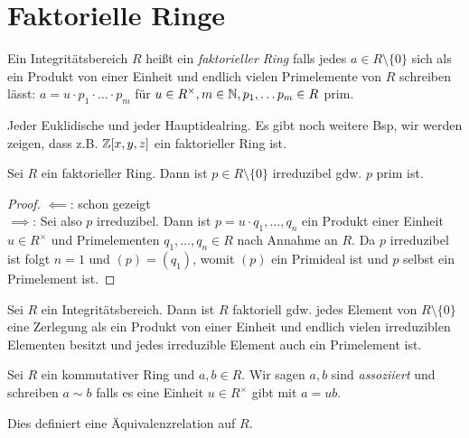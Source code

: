 \section{Faktorielle Ringe}

\begin{definition}
	Ein Integritätsbereich $R$ heißt ein \emph{faktorieller Ring} falls jedes $a \in R \setminus \{0\}$ sich als ein Produkt von einer Einheit
	und endlich vielen Primelemente von $R$ schreiben lässt: $a = u \cdot  p_1 \cdot \ldots \cdot p_{m}$ für $u \in R^{\times}, m \in \mathbb{N}, p_1,\ldots p_{m} \in R$ prim.
\end{definition}

\begin{eg}
	Jeder Euklidische und jeder Hauptidealring.
	Es gibt noch weitere Bsp, wir werden zeigen, dass z.B. $\mathbb{Z}[x,y,z]$ ein faktorieller Ring ist.
\end{eg}

\begin{proposition}
	Sei $R$ ein faktorieller Ring.
	Dann ist $p \in R \setminus \{0\} $ irreduzibel gdw. $p$ prim ist.
\end{proposition}

\begin{proof}
	$\impliedby$: \checkmark schon gezeigt\\
	$\implies$: Sei also $p$ irreduzibel. Dann ist $p = u \cdot  q_1,\ldots,q_{n}$ ein Produkt einer Einheit
	$u \in R^{\times}$ und Primelementen $q_1,\ldots, q_{n} \in R$ nach Annahme an $R$.
	Da $p$ irreduzibel ist folgt $n =1$ und $(p) = (q_1)$, womit $(p)$ ein Primideal ist und $p$ selbst ein Primelement ist.
\end{proof} 

\begin{corollary}
	Sei $R$ ein Integritätsbereich. Dann ist $R$ faktoriell gdw. jedes Element von $R \setminus \{0\} $ eine Zerlegung als ein Produkt
	von einer Einheit und endlich vielen irreduziblen Elementen besitzt und jedes irreduzible Element auch ein Primelement ist.
\end{corollary}

\begin{definition}
	Sei $R$ ein kommutativer Ring und $a,b \in R$.
	Wir sagen $a,b$ sind \emph{assoziiert} und schreiben $a \sim b$ falls es eine Einheit
	$u \in R^{\times}$ gibt mit $a = u b$.
\end{definition}

\begin{lemma}
	Dies definiert eine Äquivalenzrelation auf $R$.
\end{lemma}

